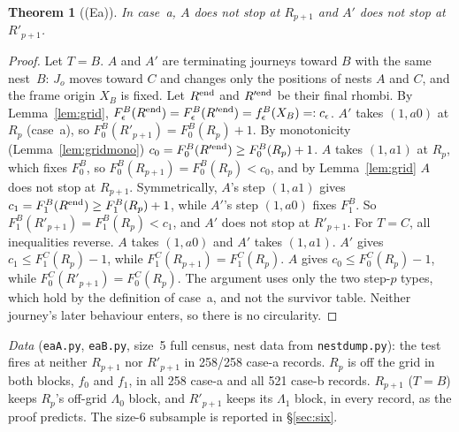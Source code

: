 \documentclass[11pt]{article}
\newtheorem{theorem}{Theorem}\newtheorem{lemma}[theorem]{Lemma}\newtheorem{proposition}[theorem]{Proposition}
\theoremstyle{definition}\newtheorem{definition}[theorem]{Definition}\newtheorem{remark}[theorem]{Remark}
\begin{document}
\begin{theorem}[(Ea)]\label{thm:ea}
In case~a, $A$ does not stop at $R_{p+1}$ and $A'$ does not stop at $R'_{p+1}$.
\end{theorem}
\begin{proof}
Let $T=B$. $A$ and $A'$ are terminating journeys toward $B$ with the same nest~$B$: $J_o$ moves toward $C$ and changes only the positions of nests $A$ and $C$, and the frame origin $X_B$ is fixed. Let $R^{\rm end}$ and $R'^{\rm end}$ be their final rhombi. By Lemma~\ref{lem:grid}, $F_\epsilon^B(R^{\rm end})=F_\epsilon^B(R'^{\rm end})=f_\epsilon^B(X_B)=:c_\epsilon$.
$A'$ takes $(1,a0)$ at $R_p$ (case~a), so $F_0^B(R'_{p+1})=F_0^B(R_p)+1$. By monotonicity (Lemma~\ref{lem:gridmono}) $c_0=F_0^B(R'^{\rm end})\ge F_0^B(R_p)+1$. $A$ takes $(1,a1)$ at $R_p$, which fixes $F_0^B$, so $F_0^B(R_{p+1})=F_0^B(R_p)<c_0$, and by Lemma~\ref{lem:grid} $A$ does not stop at $R_{p+1}$.
Symmetrically, $A$'s step $(1,a1)$ gives $c_1=F_1^B(R^{\rm end})\ge F_1^B(R_p)+1$, while $A'$'s step $(1,a0)$ fixes $F_1^B$. So $F_1^B(R'_{p+1})=F_1^B(R_p)<c_1$, and $A'$ does not stop at $R'_{p+1}$.
For $T=C$, all inequalities reverse. $A$ takes $(1,a0)$ and $A'$ takes $(1,a1)$. $A'$ gives $c_1\le F_1^C(R_p)-1$, while $F_1^C(R_{p+1})=F_1^C(R_p)$. $A$ gives $c_0\le F_0^C(R_p)-1$, while $F_0^C(R'_{p+1})=F_0^C(R_p)$.
The argument uses only the two step-$p$ types, which hold by the definition of case~a, and not the survivor table. Neither journey's later behaviour enters, so there is no circularity.
\end{proof}
\noindent\emph{Data} (\texttt{eaA.py}, \texttt{eaB.py}, size~5 full census, nest data from \texttt{nestdump.py}): the test fires at neither $R_{p+1}$ nor $R'_{p+1}$ in 258/258 case-a records. $R_p$ is off the grid in both blocks, $f_0$ and $f_1$, in all 258 case-a and all 521 case-b records. $R_{p+1}$ ($T=B$) keeps $R_p$'s off-grid $\Lambda_0$ block, and $R'_{p+1}$ keeps its $\Lambda_1$ block, in every record, as the proof predicts. The size-6 subsample is reported in \S\ref{sec:six}.
\end{document}
